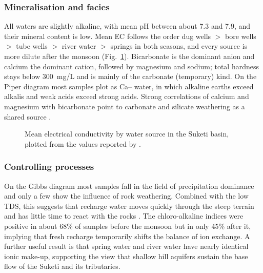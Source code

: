 \documentclass[10pt,a4paper,twocolumn]{article}
\newcommand{\mgl}{mg/L}
\begin{document}
\subsubsection{Mineralisation and facies}
All waters are slightly alkaline, with mean pH between about 7.3 and 7.9, and their
mineral content is low. Mean EC follows the order dug wells $>$ bore wells $>$ tube wells $>$ river
water $>$ springs in both seasons, and every source is more dilute after the monsoon
(Fig.~\ref{fig:ec}). Bicarbonate is the dominant anion and calcium the dominant cation, followed
by magnesium and sodium; total hardness stays below 300~\mgl{} and is mainly of the carbonate
(temporary) kind. On the Piper diagram most samples plot as Ca-- water, in which alkaline
earths exceed alkalis and weak acids exceed strong acids. Strong correlations of calcium and
magnesium with bicarbonate point to carbonate and silicate weathering as a shared source
\citep{hem1985}.

\begin{figure}[t]
\centering
{}
\caption{Mean electrical conductivity by water source in the Suketi basin, plotted from the
values reported by \citet{pophare2018}.}
\label{fig:ec}
\end{figure}

\subsubsection{Controlling processes}
On the Gibbs diagram most samples fall in the field of precipitation dominance and only a few
show the influence of rock weathering. Combined with the low TDS, this suggests that recharge
water moves quickly through the steep terrain and has little time to react with the rocks
\citep{pophare2018}. The chloro-alkaline indices were positive in about 68\% of samples before
the monsoon but in only 45\% after it, implying that fresh recharge temporarily shifts the
balance of ion exchange. A further useful result is that spring water and river water have
nearly identical ionic make-up, supporting the view that shallow hill aquifers sustain the
base flow of the Suketi and its tributaries.
\end{document}
